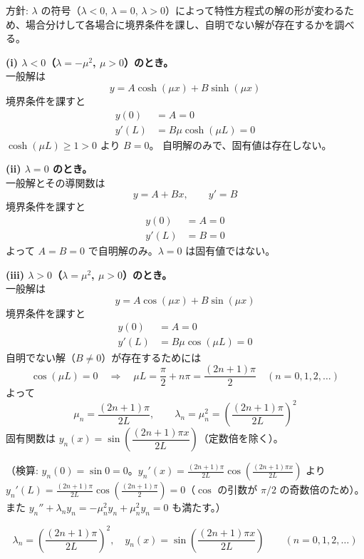 
方針: $\lambda$ の符号（$\lambda < 0$, $\lambda = 0$, $\lambda > 0$）によって特性方程式の解の形が変わるため、場合分けして各場合に境界条件を課し、自明でない解が存在するかを調べる。

\textbf{(i) $\lambda < 0$（$\lambda = -\mu^{2}$, $\mu>0$）のとき。}\\
一般解は
\[
y = A\cosh(\mu x) + B\sinh(\mu x)
\]
境界条件を課すと
\begin{align*}
y(0) &= A = 0 \\
y'(L) &= B\mu\cosh(\mu L) = 0
\end{align*}
$\cosh(\mu L) \ge 1 > 0$ より $B = 0$。
自明解のみで、固有値は存在しない。

\textbf{(ii) $\lambda = 0$ のとき。}\\
一般解とその導関数は
\[
y = A + Bx, \qquad y' = B
\]
境界条件を課すと
\begin{align*}
y(0) &= A = 0 \\
y'(L) &= B = 0
\end{align*}
よって $A=B=0$ で自明解のみ。$\lambda=0$ は固有値ではない。

\textbf{(iii) $\lambda > 0$（$\lambda = \mu^{2}$, $\mu>0$）のとき。}\\
一般解は
\[
y = A\cos(\mu x) + B\sin(\mu x)
\]
境界条件を課すと
\begin{align*}
y(0) &= A = 0 \\
y'(L) &= B\mu\cos(\mu L) = 0
\end{align*}
自明でない解（$B \neq 0$）が存在するためには
\[
\cos(\mu L) = 0 \quad\Longrightarrow\quad \mu L = \frac{\pi}{2} + n\pi = \frac{(2n+1)\pi}{2} \quad (n = 0, 1, 2, \dots)
\]
よって
\[
\mu_{n} = \frac{(2n+1)\pi}{2L}, \qquad \lambda_{n} = \mu_{n}^{2} = \left(\frac{(2n+1)\pi}{2L}\right)^{2}
\]
固有関数は $y_{n}(x) = \sin\!\left(\dfrac{(2n+1)\pi x}{2L}\right)$（定数倍を除く）。

（検算: $y_n(0) = \sin 0 = 0$。$y_n'(x) = \frac{(2n+1)\pi}{2L}\cos\left(\frac{(2n+1)\pi x}{2L}\right)$ より $y_n'(L) = \frac{(2n+1)\pi}{2L}\cos\left(\frac{(2n+1)\pi}{2}\right) = 0$（$\cos$ の引数が $\pi/2$ の奇数倍のため）。また $y_n'' + \lambda_n y_n = -\mu_n^2 y_n + \mu_n^2 y_n = 0$ も満たす。）

\[
\boxed{\; \lambda_{n} = \left(\frac{(2n+1)\pi}{2L}\right)^{2}, \quad y_{n}(x) = \sin\!\left(\frac{(2n+1)\pi x}{2L}\right) \qquad (n = 0, 1, 2, \dots) \;}
\]
